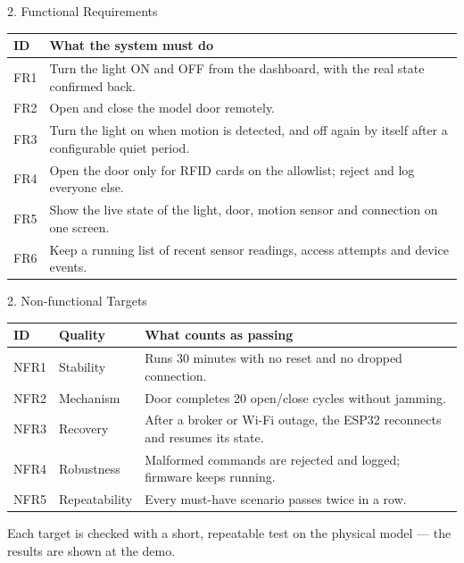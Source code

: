\documentclass[aspectratio=169,11pt]{beamer}
\renewcommand{\arraystretch}{1.18}
\begin{document}
\begin{frame}{2. Functional Requirements}
  \small
  \begin{tabularx}{\textwidth}{@{}lX@{}}
    \toprule
    \textbf{ID} & \textbf{What the system must do} \\
    \midrule
    FR1 & Turn the light ON and OFF from the dashboard, with the real state confirmed back. \\
    FR2 & Open and close the model door remotely. \\
    FR3 & Turn the light on when motion is detected, and off again by itself after a configurable quiet period. \\
    FR4 & Open the door only for RFID cards on the allowlist; reject and log everyone else. \\
    FR5 & Show the live state of the light, door, motion sensor and connection on one screen. \\
    FR6 & Keep a running list of recent sensor readings, access attempts and device events. \\
    \bottomrule
  \end{tabularx}
\end{frame}

\begin{frame}{2. Non-functional Targets}
  \footnotesize
  \renewcommand{\arraystretch}{1.05}
  \begin{tabularx}{\textwidth}{@{}lp{2.6cm}X@{}}
    \toprule
    \textbf{ID} & \textbf{Quality} & \textbf{What counts as passing} \\
    \midrule
    NFR1 & Stability & Runs 30 minutes with no reset and no dropped connection. \\
    NFR2 & Mechanism & Door completes 20 open/close cycles without jamming. \\
    NFR3 & Recovery & After a broker or Wi-Fi outage, the ESP32 reconnects and resumes its state. \\
    NFR4 & Robustness & Malformed commands are rejected and logged; firmware keeps running. \\
    NFR5 & Repeatability & Every must-have scenario passes twice in a row. \\
    \bottomrule
  \end{tabularx}
  \vspace{0.35cm}
  {\small Each target is checked with a short, repeatable test on the physical model --- the results are shown at the demo.}
\end{frame}
\end{document}
